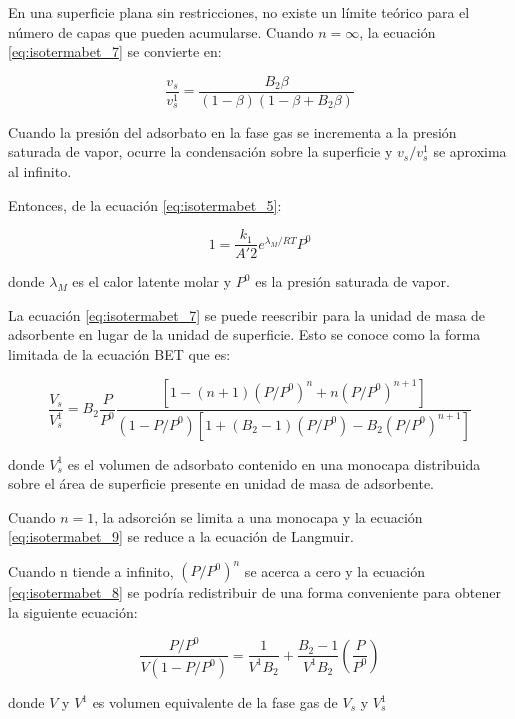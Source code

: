 \documentclass[11pt]{book}
\begin{document}
En una superficie plana sin restricciones, no existe un límite teórico para el número de capas que pueden acumularse. Cuando $n = \infty$, la ecuación \ref{eq:isotermabet_7} se convierte en:

\begin{equation}
    \label{eq:isotermabet_8}
    \frac{v_s}{v_s^1} = \frac{B_2 \beta}{(1-\beta)(1-\beta+B_2\beta)}
\end{equation}

Cuando la presión del adsorbato en la fase gas se incrementa a la presión saturada de vapor, ocurre la condensación sobre la superficie y $v_s/v_s^1$ se aproxima al infinito. 

Entonces, de la ecuación \ref{eq:isotermabet_5}:

\begin{equation}
    1 = \frac{k_1}{A'2} e^{\lambda_M/RT} P^0
\end{equation}

donde $\lambda_M$ es el calor latente molar y $P^0$ es la presión saturada de vapor.

La ecuación \ref{eq:isotermabet_7} se puede reescribir para la unidad de masa de adsorbente en lugar de la unidad de superficie. Esto se conoce como la forma limitada de la ecuación BET que es:

\begin{equation}
    \label{eq:isotermabet_9}
    \frac{V_s}{V_s^1} = B_2 \frac{P}{P^0} \frac{\left[ 1 - (n+1)(P/P^0)^n + n(P/P^0)^{n+1} \right]}{(1 - P/P^0)\left[ 1 + (B_2 - 1)(P/P^0) - B_2(P/P^0)^{n+1} \right]}
\end{equation}

donde $V_s^1$ es el volumen de adsorbato contenido en una monocapa distribuida sobre el área de superficie presente en unidad de masa de adsorbente.

Cuando $n = 1$, la adsorción se limita a una monocapa y la ecuación \ref{eq:isotermabet_9} se reduce a la ecuación de Langmuir.

Cuando n tiende a infinito, $(P/P^0)^n$ se acerca a cero y la ecuación \ref{eq:isotermabet_8} se podría redistribuir de una forma conveniente para obtener la siguiente ecuación:

\begin{equation}
    \label{eq:isotermabet_10}
    \frac{P/P^0}{V(1-P/P^0)} = \frac{1}{V^1 B_2} + \frac{B_2-1}{V^1 B_2} \left( \frac{P}{P^0} \right)
\end{equation}

donde $V$ y $V^1$ es volumen equivalente de la fase gas de $V_s$ y $V_s^1$
\end{document}
